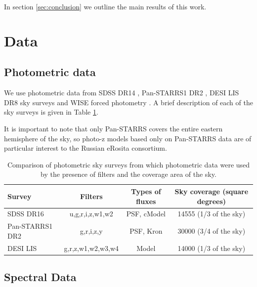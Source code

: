 \documentclass[fleqn,usenatbib]{mnras}
\begin{document}
In section \ref{sec:conclusion} we outline the main results of this work.


\section{Data}\label{sec:data}
\subsection{Photometric data}
We use photometric data from SDSS DR14 \citep{2018ApJS..235...42A}, Pan-STARRS1 DR2 \citep{2018AAS...23110201C}, DESI LIS DR8 \citep{2019AJ....157..168D} sky surveys and WISE forced photometry \citep{2010AJ....140.1868W}. A brief description of each of the sky surveys is given in Table \ref{tab:catalogs_comparison}.

It is important to note that only Pan-STARRS covers the entire eastern hemisphere of the sky, so photo-z models based only on Pan-STARRS data are of particular interest to the Russian eRosita consortium.

\begin{table}
    \caption{Comparison of photometric sky surveys from which photometric data were used by the presence of filters and the coverage area of the sky.}
    \label{tab:catalogs_comparison}
    \centering
    \begin{tabular}{|l|c|c|c|}
    \hline
        Survey & Filters & Types of fluxes & Sky coverage (square degrees) \\
    \hline
        SDSS DR16 & u,g,r,i,z,w1,w2 & PSF, cModel & 14555 (1/3 of the sky) \\
        Pan-STARRS1 DR2 & g,r,i,z,y & PSF, Kron & 30000 (3/4 of the sky) \\
        DESI LIS & g,r,z,w1,w2,w3,w4 & Model & 14000 (1/3 of the sky) \\[1ex]
        \hline
    \end{tabular}
\end{table}

\subsection{Spectral Data}
\end{document}
